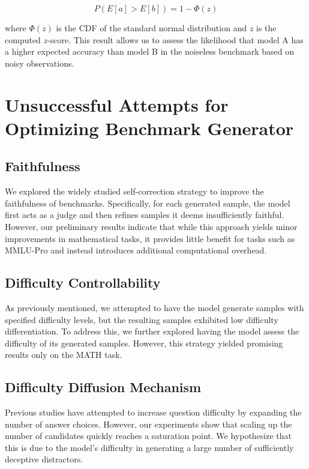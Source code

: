\[
P(E[a] > E[b]) = 1 - \Phi(z)
\]

where \( \Phi(z) \) is the CDF of the standard normal distribution and \( z \) is the computed \( z \)-score. This result allows us to assess the likelihood that model A has a higher expected accuracy than model B in the noiseless benchmark based on noisy observations.

\section{Unsuccessful Attempts for Optimizing Benchmark Generator}
\label{sec:unsuccess}
\subsection{Faithfulness}
We explored the widely studied self-correction strategy to improve the faithfulness of benchmarks. Specifically, for each generated sample, the model first acts as a judge and then refines samples it deems insufficiently faithful. However, our preliminary results indicate that while this approach yields minor improvements in mathematical tasks, it provides little benefit for tasks such as MMLU-Pro and instead introduces additional computational overhead.

\subsection{Difficulty Controllability}
As previously mentioned, we attempted to have the model generate samples with specified difficulty levels, but the resulting samples exhibited low difficulty differentiation. To address this, we further explored having the model assess the difficulty of its generated samples. However, this strategy yielded promising results only on the MATH task.

\subsection{Difficulty Diffusion Mechanism}
Previous studies \citep{mmlupro} have attempted to increase question difficulty by expanding the number of answer choices. However, our experiments show that scaling up the number of candidates quickly reaches a saturation point. We hypothesize that this is due to the model’s difficulty in generating a large number of sufficiently deceptive distractors.

